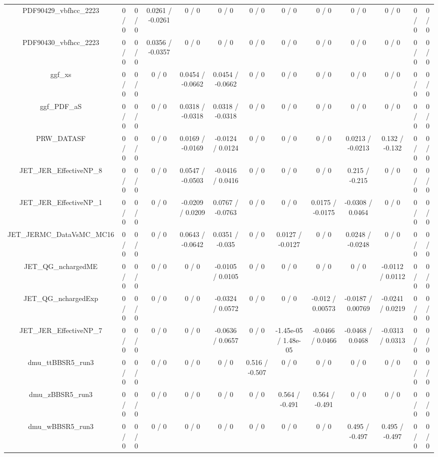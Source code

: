 \documentclass[10pt]{article}
\begin{document}
\begin{table}[htbp]
\begin{center}
\begin{tabular}{|c|c|c|c|c|c|c|c|c|c|c|c|c|}
  PDF90429_vbfhcc_2223 & 0 / 0 & 0 / 0 & 0.0261 / -0.0261 & 0 / 0 & 0 / 0 & 0 / 0 & 0 / 0 & 0 / 0 & 0 / 0 & 0 / 0 & 0 / 0 & 0 / 0 \\ 
  PDF90430_vbfhcc_2223 & 0 / 0 & 0 / 0 & 0.0356 / -0.0357 & 0 / 0 & 0 / 0 & 0 / 0 & 0 / 0 & 0 / 0 & 0 / 0 & 0 / 0 & 0 / 0 & 0 / 0 \\ 
  ggf_xs & 0 / 0 & 0 / 0 & 0 / 0 & 0.0454 / -0.0662 & 0.0454 / -0.0662 & 0 / 0 & 0 / 0 & 0 / 0 & 0 / 0 & 0 / 0 & 0 / 0 & 0 / 0 \\ 
  ggf_PDF_aS & 0 / 0 & 0 / 0 & 0 / 0 & 0.0318 / -0.0318 & 0.0318 / -0.0318 & 0 / 0 & 0 / 0 & 0 / 0 & 0 / 0 & 0 / 0 & 0 / 0 & 0 / 0 \\ 
  PRW_DATASF & 0 / 0 & 0 / 0 & 0 / 0 & 0.0169 / -0.0169 & -0.0124 / 0.0124 & 0 / 0 & 0 / 0 & 0 / 0 & 0.0213 / -0.0213 & 0.132 / -0.132 & 0 / 0 & 0 / 0 \\ 
  JET_JER_EffectiveNP_8 & 0 / 0 & 0 / 0 & 0 / 0 & 0.0547 / -0.0503 & -0.0416 / 0.0416 & 0 / 0 & 0 / 0 & 0 / 0 & 0.215 / -0.215 & 0 / 0 & 0 / 0 & 0 / 0 \\ 
  JET_JER_EffectiveNP_1 & 0 / 0 & 0 / 0 & 0 / 0 & -0.0209 / 0.0209 & 0.0767 / -0.0763 & 0 / 0 & 0 / 0 & 0.0175 / -0.0175 & -0.0308 / 0.0464 & 0 / 0 & 0 / 0 & 0 / 0 \\ 
  JET_JERMC_DataVsMC_MC16 & 0 / 0 & 0 / 0 & 0 / 0 & 0.0643 / -0.0642 & 0.0351 / -0.035 & 0 / 0 & 0.0127 / -0.0127 & 0 / 0 & 0.0248 / -0.0248 & 0 / 0 & 0 / 0 & 0 / 0 \\ 
  JET_QG_nchargedME & 0 / 0 & 0 / 0 & 0 / 0 & 0 / 0 & -0.0105 / 0.0105 & 0 / 0 & 0 / 0 & 0 / 0 & 0 / 0 & -0.0112 / 0.0112 & 0 / 0 & 0 / 0 \\ 
  JET_QG_nchargedExp & 0 / 0 & 0 / 0 & 0 / 0 & 0 / 0 & -0.0324 / 0.0572 & 0 / 0 & 0 / 0 & -0.012 / 0.00573 & -0.0187 / 0.00769 & -0.0241 / 0.0219 & 0 / 0 & 0 / 0 \\ 
  JET_JER_EffectiveNP_7 & 0 / 0 & 0 / 0 & 0 / 0 & 0 / 0 & -0.0636 / 0.0657 & 0 / 0 & -1.45e-05 / 1.48e-05 & -0.0466 / 0.0466 & -0.0468 / 0.0468 & -0.0313 / 0.0313 & 0 / 0 & 0 / 0 \\ 
  dmu_ttBBSR5_run3 & 0 / 0 & 0 / 0 & 0 / 0 & 0 / 0 & 0 / 0 & 0.516 / -0.507 & 0 / 0 & 0 / 0 & 0 / 0 & 0 / 0 & 0 / 0 & 0 / 0 \\ 
  dmu_zBBSR5_run3 & 0 / 0 & 0 / 0 & 0 / 0 & 0 / 0 & 0 / 0 & 0 / 0 & 0.564 / -0.491 & 0.564 / -0.491 & 0 / 0 & 0 / 0 & 0 / 0 & 0 / 0 \\ 
  dmu_wBBSR5_run3 & 0 / 0 & 0 / 0 & 0 / 0 & 0 / 0 & 0 / 0 & 0 / 0 & 0 / 0 & 0 / 0 & 0.495 / -0.497 & 0.495 / -0.497 & 0 / 0 & 0 / 0 \\ 

\end{tabular}
\end{center}
\end{table}
\end{document}
